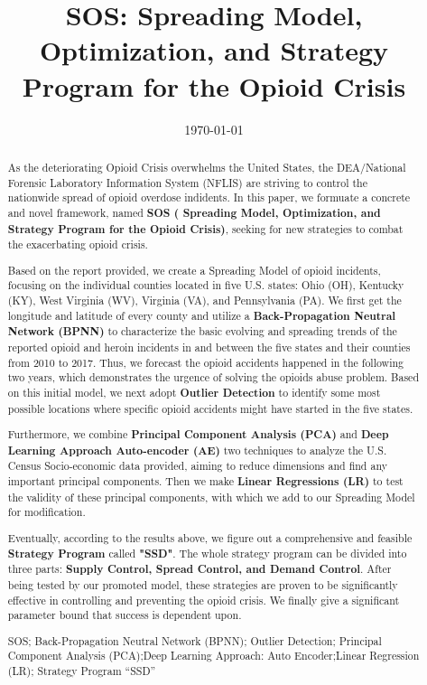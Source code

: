 \documentclass{mcmthesis}
\author{}
\begin{document}
\linespread{0.6}  %
\setlength{\parskip}{0.5\baselineskip}  %
\title{SOS: Spreading Model, Optimization, and Strategy Program for the Opioid Crisis}

\date{\today}
	\begin{abstract}
	As the deteriorating Opioid Crisis overwhelms the United States, the DEA/National Forensic Laboratory Information System (NFLIS) are striving to control the nationwide spread of opioid overdose indidents. In this paper, we formuate a concrete and novel framework, named \textbf{SOS ( Spreading Model, Optimization, and Strategy Program for the Opioid Crisis)}, seeking for new strategies to combat the exacerbating opioid crisis.
	
	Based on the report provided, we create a Spreading Model of opioid incidents, focusing on the individual counties located in five U.S. states: Ohio (OH), Kentucky (KY), West Virginia (WV), Virginia (VA), and Pennsylvania (PA). We first get the longitude and latitude of every county and utilize a \textbf{Back-Propagation Neutral Network (BPNN)} to characterize the basic evolving and spreading trends of the reported opioid and heroin incidents in and between the five states and their counties from 2010 to 2017. Thus, we forecast the opioid accidents happened in the following two years, which demonstrates the urgence of solving the opioids abuse problem. Based on this initial model, we next adopt \textbf{Outlier Detection} to identify some most possible locations where specific opioid accidents might have started in the five states. 
	
	Furthermore, we combine \textbf{Principal Component Analysis (PCA)} and \textbf{Deep Learning Approach Auto-encoder (AE)} two techniques to analyze the U.S. Census Socio-economic data provided, aiming to reduce dimensions and find any important principal components. Then we make \textbf{Linear Regressions (LR)} to test the validity of these principal components, with which we add to our Spreading Model for modification.
	
	Eventually, according to the results above, we figure out a comprehensive and feasible \textbf{Strategy Program} called \textbf{"SSD"}. The whole strategy program can be divided into three parts: \textbf{Supply Control, Spread Control, and Demand Control}. After being tested by our promoted model, these strategies are proven to be significantly effective in controlling and preventing the opioid crisis. We finally give a significant parameter bound that success is dependent upon.
	
		\begin{keywords}
		SOS; Back-Propagation Neutral Network (BPNN); Outlier Detection; Principal Component Analysis (PCA);Deep Learning Approach: Auto Encoder;Linear Regression (LR); Strategy Program ``SSD''
		\end{keywords}
	\end{abstract}
\end{document}

